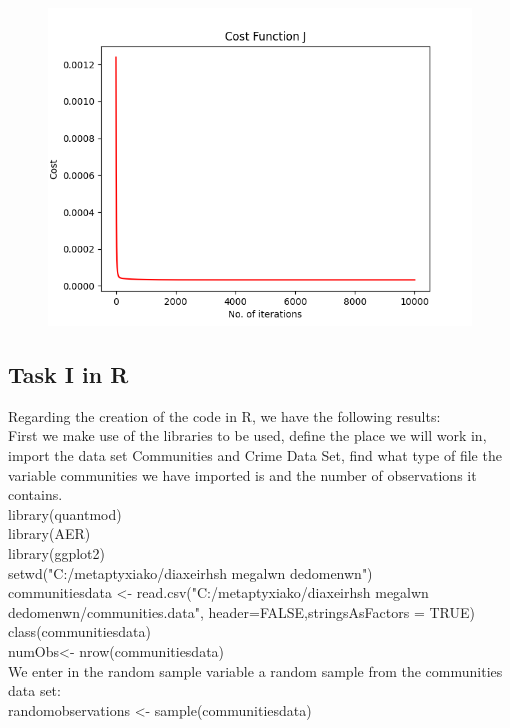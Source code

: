 \documentclass[10pt,a4paper]{article}
\begin{document}
\begin{figure}
	\includegraphics[scale=0.7]{Figure}
	\centering
\end{figure}


	
\subsection{Task I in R}
	Regarding the creation of the code in R, we have the following results:\\
	First we make use of the libraries to be used, define the place we will work in, import the data set Communities and Crime Data Set, find what type of file the variable communities we have imported is and the number of observations it contains.\\
	library(quantmod)\\
	library(AER)\\
	library(ggplot2)\\
	
	setwd("C:/metaptyxiako/diaxeirhsh megalwn dedomenwn")\\
	communitiesdata <- read.csv("C:/metaptyxiako/diaxeirhsh megalwn dedomenwn/communities.data", header=FALSE,stringsAsFactors = TRUE)\\
	class(communitiesdata)\\
	numObs<- nrow(communitiesdata)\\
	
	We enter in the random sample variable a random sample from the communities data set:\\
	randomobservations <- sample(communitiesdata)\\
	
\end{document}
